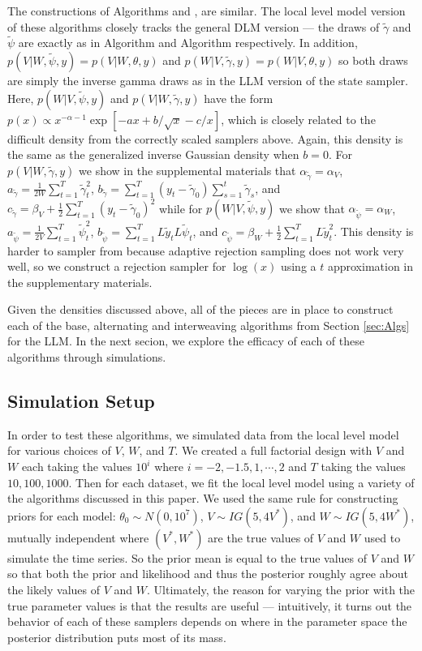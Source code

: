 \documentclass{article}
\begin{document}
The constructions of Algorithms  and , are similar. The local level model version of these algorithms closely tracks the general DLM version --- the draws of $\tilde{\gamma}$ and $\tilde{\psi}$ are exactly as in Algorithm  and Algorithm  respectively. In addition, $p(V|W,\tilde{\psi},y)=p(V|W,\theta,y)$ and $p(W|V,\tilde{\gamma},y)=p(W|V,\theta,y)$ so both draws are simply the inverse gamma draws as in the LLM version of the state sampler. Here, $p(W|V,\tilde{\psi},y)$ and $p(V|W,\tilde{\gamma},y)$ have the form $p(x)\propto x^{-\alpha-1}\exp\left[ -ax + b/\sqrt{x} -c/x\right]$, which is closely related to the difficult density from the correctly scaled samplers above. Again, this density is the same as the generalized inverse Gaussian density when $b=0$. For $p(V|W,\tilde{\gamma},y)$ we show in the supplemental materials that $\alpha_{\tilde{\gamma}}=\alpha_V$, $a_{\tilde{\gamma}} = \frac{1}{2W}\sum_{t=1}^T\tilde{\gamma}_t^2$, $b_{\tilde{\gamma}} = \sum_{t=1}^T(y_t - \tilde{\gamma}_0)\sum_{s=1}^t\tilde{\gamma}_s$, and $c_{\tilde{\gamma}} = \beta_V + \frac{1}{2}\sum_{t=1}^T(y_t - \tilde{\gamma}_0)^2$ while for $p(W|V,\tilde{\psi},y)$ we show that $\alpha_{\tilde{\psi}}=\alpha_W$,   $a_{\tilde{\psi}} = \frac{1}{2V}\sum_{t=1}^T\tilde{\psi}_t^2$,  $b_{\tilde{\psi}} = \sum_{t=1}^TL\tilde{y}_tL\tilde{\psi}_t$, and $c_{\tilde{\psi}} = \beta_W + \frac{1}{2}\sum_{t=1}^TL\tilde{y}_t^2$. This density is harder to sampler from because adaptive rejection sampling does not work very well, so we construct a rejection sampler for $\log(x)$ using a $t$ approximation in the supplementary materials.

Given the densities discussed above, all of the pieces are in place to construct each of the base, alternating and interweaving algorithms from Section \ref{sec:Algs} for the LLM. In the next secion, we explore the efficacy of each of these algorithms through simulations.

\subsection{Simulation Setup}

In order to test these algorithms, we simulated data from the local level model for various choices of $V$, $W$, and $T$. We created a full factorial design with $V$ and $W$ each taking the values $10^{i}$ where $i=-2,-1.5,1,\cdots,2$ and $T$ taking the values $10, 100, 1000$. Then for each dataset, we fit the local level model using a variety of the algorithms discussed in this paper. We used the same rule for constructing priors for each model: $\theta_0\sim N(0,10^7)$, $V\sim IG(5, 4V^*)$, and $W\sim IG(5, 4W^*)$, mutually independent where $(V^*,W^*)$ are the true values of $V$ and $W$ used to simulate the time series. So the prior mean is equal to the true values of $V$ and $W$ so that both the prior and likelihood and thus the posterior roughly agree about the likely values of $V$ and $W$. Ultimately, the reason for varying the prior with the true parameter values is that the results are useful --- intuitively, it turns out the behavior of each of these samplers depends on where in the parameter space the posterior distribution puts most of its mass.
\end{document}
